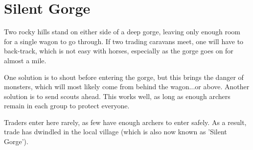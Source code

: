 \section{Silent Gorge}
\label{silentGorge}

\begin{multicols}{2}

\noindent
Two rocky hills stand on either side of a deep gorge, leaving only enough room for a single wagon to go through.
If two trading caravans meet, one will have to back-track, which is not easy with horses, especially as the gorge goes on for almost a mile.

One solution is to shout before entering the gorge, but this brings the danger of monsters, which will most likely come from behind the wagon...or above.
Another solution is to send scouts ahead.
This works well, as long as enough archers remain in each group to protect everyone.

Traders enter here rarely, as few have enough archers to enter safely.
As a result, trade has dwindled in the local \gls{village} (which is also now known as 'Silent Gorge').

\end{multicols}

